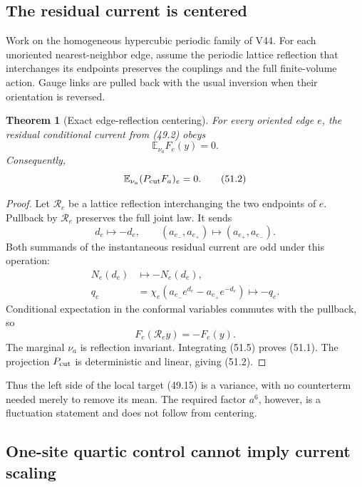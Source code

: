 \documentclass[11pt]{article}
\newtheorem{theorem}{Theorem}[section]
\theoremstyle{remark}
\begin{document}
\subsection{The residual current is centered}

Work on the homogeneous hypercubic periodic family of V44.  For each
unoriented nearest-neighbor edge, assume the periodic lattice
reflection that interchanges its endpoints preserves the couplings and
the full finite-volume action.  Gauge links are pulled back with the
usual inversion when their orientation is reversed.

\begin{theorem}[Exact edge-reflection centering]
\label{thm:v17v51-centering}
For every oriented edge \(e\), the residual conditional current from
(49.2) obeys
\[
\boxed{
 \mathbb E_{\nu_a}F_e(y)=0.}                       \tag{51.1}
\]
Consequently,
\[
 \mathbb E_{\nu_a}(P_{\rm cut}F_a)_e=0.           \tag{51.2}
\]
\end{theorem}

\begin{proof}
Let \(\mathcal R_e\) be a lattice reflection interchanging the two
endpoints of \(e\).  Pullback by \(\mathcal R_e\) preserves the full
joint law.  It sends
\[
 d_e\longmapsto-d_e,\qquad
 (a_{e_-},a_{e_+})\longmapsto(a_{e_+},a_{e_-}).    \tag{51.3}
\]
Both summands of the instantaneous residual current are odd under this
operation:
\[
\begin{aligned}
 N_e(d_e)&\longmapsto-N_e(d_e),\\
 q_e&=\chi_e(a_{e_-}e^{d_e}-a_{e_+}e^{-d_e})
 \longmapsto-q_e.                                 \tag{51.4}
\end{aligned}
\]
Conditional expectation in the conformal variables commutes with the
pullback, so
\[
 F_e(\mathcal R_ey)=-F_e(y).                      \tag{51.5}
\]
The marginal \(\nu_a\) is reflection invariant.  Integrating (51.5)
proves (51.1).  The projection \(P_{\rm cut}\) is deterministic and
linear, giving (51.2).
\end{proof}

Thus the left side of the local target (49.15) is a variance, with no
counterterm needed merely to remove its mean.  The required factor
\(a^6\), however, is a fluctuation statement and does not follow from
centering.

\subsection{One-site quartic control cannot imply current scaling}
\end{document}
